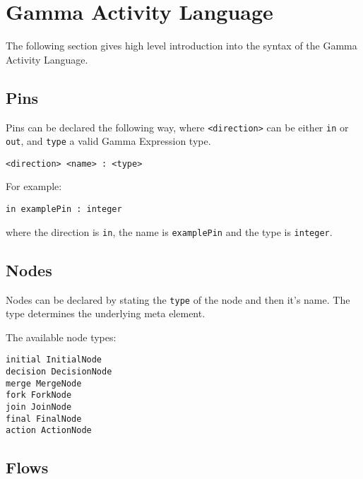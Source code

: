 \clearpage\section{Gamma Activity Language}\label{sec:gamma-activity-language-constructs}

The following section gives high level introduction into the syntax of the Gamma Activity Language.

\subsection*{Pins}\label{sssec:pins}

Pins can be declared the following way, where \verb|<direction>| can be either \verb|in| or \verb|out|, and \verb|type| a valid Gamma Expression type.

\begin{lstlisting}[language=activity]
<direction> <name> : <type>
\end{lstlisting}

For example: 

\begin{lstlisting}[language=activity]
in examplePin : integer
\end{lstlisting}

where the direction is \verb|in|, the name is \verb|examplePin| and the type is \verb|integer|.

\subsection*{Nodes}\label{sssec:nodes}

Nodes can be declared by stating the \verb|type| of the node and then it's name. The type determines the underlying meta element.

The available node types:

\begin{lstlisting}[language=activity]
initial InitialNode
decision DecisionNode
merge MergeNode
fork ForkNode
join JoinNode
final FinalNode
action ActionNode
\end{lstlisting}

\subsection*{Flows}\label{sssec:flows}

